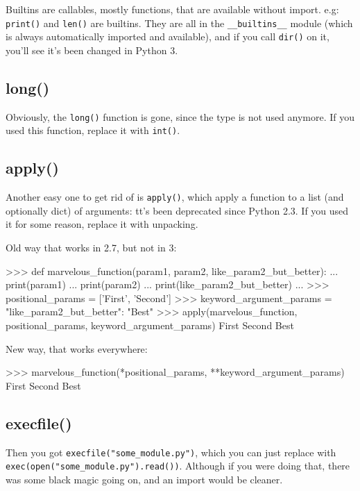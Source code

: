 Builtins are \glspl{callable}, mostly functions, that are available without import. e.g: \lstinline{print()} and \lstinline{len()} are builtins. They are all in the \lstinline{__builtins__} module (which is always automatically imported and available), and if you call \lstinline{dir()} on it, you'll see it's been changed in Python 3.

\subsection{long()}

Obviously, the \lstinline{long()} function is gone, since the type is not used anymore. If you used this function, replace it with \lstinline{int()}.

\subsection{apply()}

Another easy one to get rid of is \lstinline{apply()}, which apply a function to a list (and optionally dict) of arguments: tt's been deprecated since Python 2.3. If you used it for some reason, replace it with unpacking.

Old way that works in 2.7, but not in 3:

\begin{py}
>>> def marvelous_function(param1, param2, like_param2_but_better):
...    print(param1)
...    print(param2)
...    print(like_param2_but_better)
...
>>> positional_params = ['First', 'Second']
>>> keyword_argument_params = {"like_param2_but_better": "Best"}
>>> apply(marvelous_function, positional_params, keyword_argument_params)
First
Second
Best
\end{py}

New way, that works everywhere:

\begin{py}
>>> marvelous_function(*positional_params, **keyword_argument_params)
First
Second
Best
\end{py}

\subsection{execfile()}

Then you got \lstinline{execfile("some_module.py")}, which you can just replace with \lstinline{exec(open("some_module.py").read())}. Although if you were doing that, there was some black magic going on, and an import would be cleaner.

